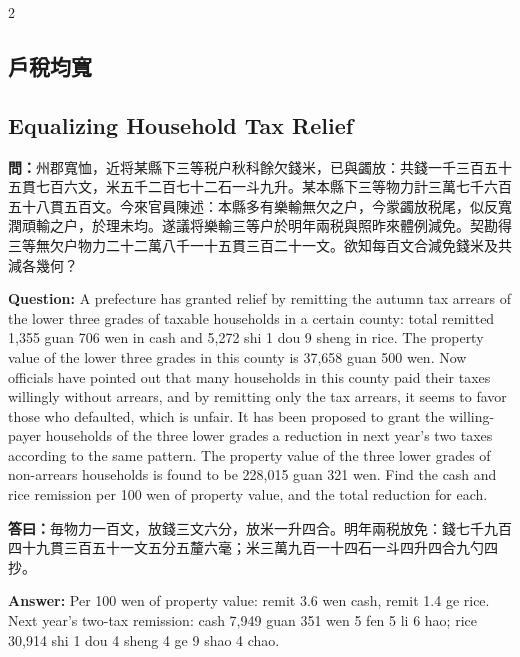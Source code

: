 \documentclass[11pt,a4paper]{article}
\newcommand{\QuestionText}[1]{\par\noindent\textbf{\color{problemcolor}問：}#1\par}
\newcommand{\AnswerText}[1]{\par\noindent\textbf{\color{answercolor}答曰：}#1\par}
\newcommand{\QuestionEn}[1]{\par\noindent\textbf{\color{problemcolor}Question:} #1\par}
\newcommand{\AnswerEn}[1]{\par\noindent\textbf{\color{answercolor}Answer:} #1\par}
\begin{document}
\begin{paracol}{2}

\subsection*{\color{sectioncolor}戶稅均寬}
\switchcolumn
\subsection*{\color{sectioncolor}Equalizing Household Tax Relief}
\switchcolumn*

\QuestionText{州郡寬恤，近将某縣下三等税户秋科餘欠錢米，已與蠲放：共錢一千三百五十五貫七百六文，米五千二百七十二石一斗九升。某本縣下三等物力計三萬七千六百五十八貫五百文。今來官員陳述：本縣多有樂輸無欠之户，今䝉蠲放税尾，似反寬潤頑輸之户，於理未均。遂議将樂輸三等户於明年兩税與照昨來體例減免。契勘得三等無欠户物力二十二萬八千一十五貫三百二十一文。欲知每百文合減免錢米及共減各幾何？}
\switchcolumn
\QuestionEn{A prefecture has granted relief by remitting the autumn tax arrears of the lower three grades of taxable households in a certain county: total remitted 1,355 guan 706 wen in cash and 5,272 shi 1 dou 9 sheng in rice. The property value of the lower three grades in this county is 37,658 guan 500 wen. Now officials have pointed out that many households in this county paid their taxes willingly without arrears, and by remitting only the tax arrears, it seems to favor those who defaulted, which is unfair. It has been proposed to grant the willing-payer households of the three lower grades a reduction in next year's two taxes according to the same pattern. The property value of the three lower grades of non-arrears households is found to be 228,015 guan 321 wen. Find the cash and rice remission per 100 wen of property value, and the total reduction for each.}
\switchcolumn*

\AnswerText{毎物力一百文，放錢三文六分，放米一升四合。明年兩税放免：錢七千九百四十九貫三百五十一文五分五釐六毫；米三萬九百一十四石一斗四升四合九勺四抄。}
\switchcolumn
\AnswerEn{Per 100 wen of property value: remit 3.6 wen cash, remit 1.4 ge rice. Next year's two-tax remission: cash 7,949 guan 351 wen 5 fen 5 li 6 hao; rice 30,914 shi 1 dou 4 sheng 4 ge 9 shao 4 chao.}
\switchcolumn*


\end{paracol}
\end{document}
